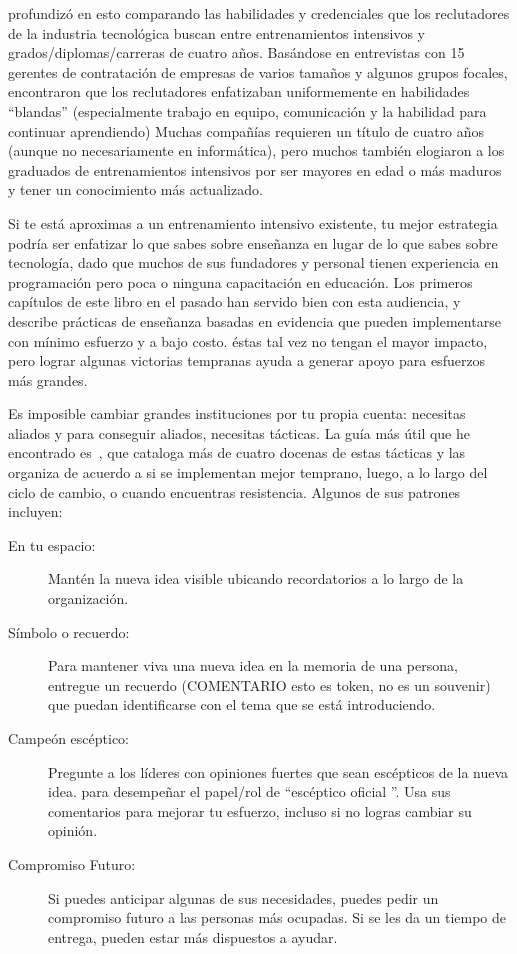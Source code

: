 \cite{Burk2018} profundizó en esto
comparando las habilidades y credenciales que los reclutadores de la industria tecnológica buscan 
entre  entrenamientos intensivos y grados/diplomas/carreras de cuatro años.
Basándose en entrevistas con 15 gerentes de contratación de empresas de varios tamaños y algunos grupos focales,
encontraron que los reclutadores enfatizaban uniformemente en habilidades “blandas”
(especialmente trabajo en equipo, comunicación y la habilidad para continuar aprendiendo)
Muchas compañías requieren un título de cuatro años
(aunque no necesariamente en informática),
pero muchos también elogiaron a los graduados de  entrenamientos intensivos por ser mayores en edad o más maduros
y tener un conocimiento más actualizado.


Si te está aproximas a un  entrenamiento intensivo existente,
tu mejor estrategia podría ser enfatizar lo que sabes sobre enseñanza
en lugar de lo que sabes sobre tecnología,
dado que muchos de sus fundadores y personal tienen experiencia en programación
pero poca o ninguna capacitación en educación.
Los primeros capítulos de este libro en el pasado han servido bien con esta audiencia,
y ~\cite{Lang2016} describe
prácticas de enseñanza basadas en evidencia que pueden implementarse
con mínimo esfuerzo y a bajo costo.
éstas tal vez no tengan el mayor impacto, 
pero lograr algunas victorias tempranas ayuda a generar apoyo para esfuerzos más grandes.



Es imposible cambiar grandes instituciones por tu propia cuenta:
necesitas aliados
y para conseguir aliados,
necesitas tácticas.
La guía más útil que he encontrado es~\cite{Mann2015}, 
que cataloga más de cuatro docenas de estas tácticas
y las organiza de acuerdo a si se implementan mejor temprano,
luego,
a lo largo del ciclo de cambio,
o cuando encuentras resistencia.
Algunos de sus patrones incluyen:

\begin{description}

\item[En tu espacio:]
Mantén la nueva idea visible
ubicando recordatorios a lo largo de la organización.

\item[Símbolo o recuerdo:] 
Para mantener viva una nueva idea en la memoria de una persona,
entregue un recuerdo (COMENTARIO esto es token, no es un souvenir)   que puedan identificarse con el tema que se está introduciendo.

\item[Campeón escéptico:]
Pregunte a los líderes con opiniones  fuertes que sean escépticos de la nueva idea.
para desempeñar el papel/rol de ``escéptico oficial ''.
Usa sus comentarios para mejorar tu esfuerzo,
incluso si no logras cambiar su opinión.


\item[Compromiso Futuro:]
 
 Si puedes anticipar algunas de sus necesidades,
puedes pedir un compromiso futuro a las personas más ocupadas.
Si se les da un tiempo de entrega,
pueden estar más dispuestos a ayudar.

  
\end{description}

